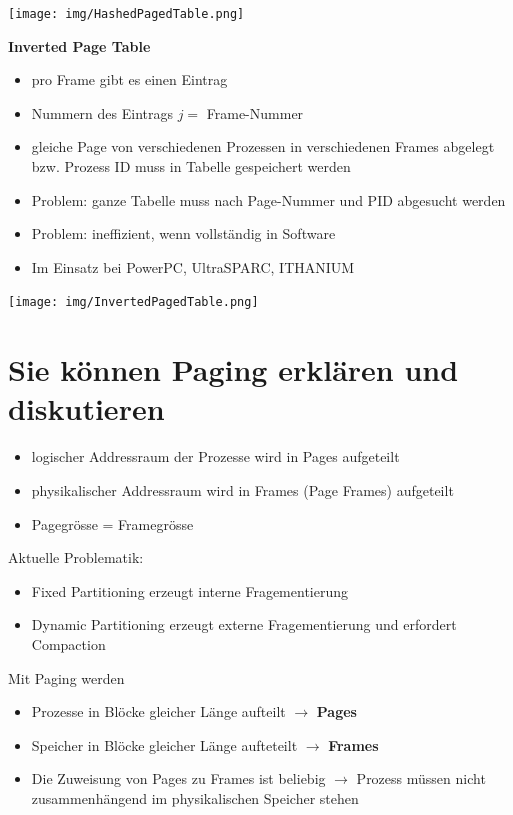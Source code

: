 \documentclass{report}
\newenvironment{Figure}
	{\par\medskip\noindent\minipage{\linewidth}}
	{\endminipage\par\medskip}
\theoremstyle{definition}
\theoremstyle{example}
\begin{document}
\begin{Figure}
\centering
\texttt{[image: img/HashedPagedTable.png]}
	\label{fig:Abbildung einer Hashed Page Table}
\end{Figure}

\textbf{Inverted Page Table}
\begin{itemize}
	\item pro Frame gibt es einen Eintrag
	\item Nummern des Eintrags $j = $ Frame-Nummer
	\item gleiche Page von verschiedenen Prozessen in verschiedenen Frames abgelegt bzw. Prozess ID muss in Tabelle gespeichert werden
	\item Problem: ganze Tabelle muss nach Page-Nummer und PID abgesucht werden
	\item Problem: ineffizient, wenn vollständig in Software
	\item Im Einsatz bei PowerPC, UltraSPARC, ITHANIUM 
\end{itemize}

\begin{Figure}
\centering
\texttt{[image: img/InvertedPagedTable.png]}
	\label{fig:Abbildung einer Inverted Page Table}
\end{Figure}

\section{Sie können Paging erklären und diskutieren}

\begin{itemize}
	\item logischer Addressraum der Prozesse wird in Pages aufgeteilt
	\item physikalischer Addressraum wird in Frames (Page Frames) aufgeteilt
	\item Pagegrösse = Framegrösse
\end{itemize}

Aktuelle Problematik:
\begin{itemize}
	\item Fixed Partitioning erzeugt interne Fragementierung
	\item Dynamic Partitioning erzeugt externe Fragementierung und erfordert Compaction
\end{itemize}

Mit Paging werden
\begin{itemize}
	\item Prozesse in Blöcke  gleicher Länge aufteilt $\rightarrow$ \textbf{Pages}
	\item Speicher in Blöcke gleicher Länge aufteteilt $\rightarrow$ \textbf{Frames}
	\item Die Zuweisung von Pages zu Frames ist beliebig $\rightarrow$ Prozess müssen nicht zusammenhängend im physikalischen Speicher stehen
\end{itemize}
\end{document}
